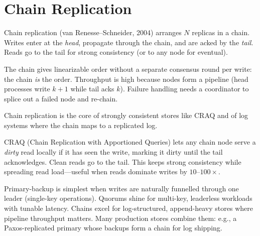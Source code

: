 \section{Chain Replication}
\label{sec:chain}
Chain replication (van Renesse--Schneider, 2004) arranges $N$ replicas in a chain. Writes enter at the \emph{head}, propagate through the chain, and are acked by the \emph{tail}. Reads go to the tail for strong consistency (or to any node for eventual).

The chain gives linearizable order without a separate consensus round per write: the chain \emph{is} the order. Throughput is high because nodes form a pipeline (head processes write $k+1$ while tail acks $k$). Failure handling needs a coordinator to splice out a failed node and re-chain.

Chain replication is the core of strongly consistent stores like CRAQ and of log systems where the chain maps to a replicated log.

\begin{example}
CRAQ (Chain Replication with Apportioned Queries) lets any chain node serve a \emph{dirty} read locally if it has seen the write, marking it dirty until the tail acknowledges. Clean reads go to the tail. This keeps strong consistency while spreading read load---useful when reads dominate writes by $10$--$100\times$.
\end{example}

\begin{remark}
Primary-backup is simplest when writes are naturally funnelled through one leader (single-key operations). Quorums shine for multi-key, leaderless workloads with tunable latency. Chains excel for log-structured, append-heavy stores where pipeline throughput matters. Many production stores combine them: e.g., a Paxos-replicated primary whose backups form a chain for log shipping.
\end{remark}

